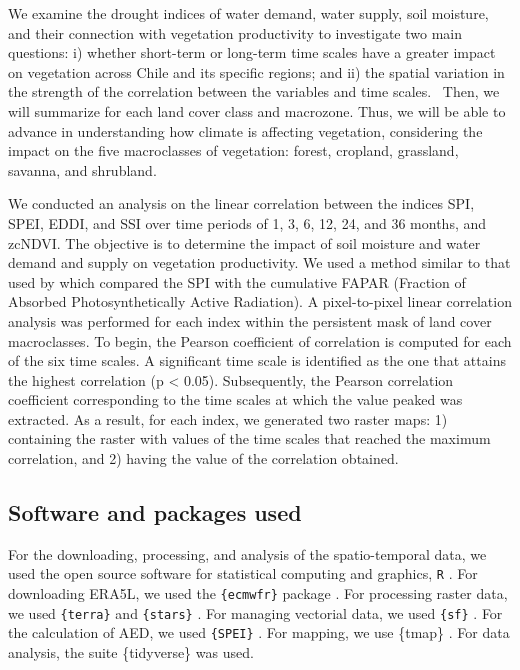 \documentclass[
  authoryear,
  preprint,
  3p,
  onecolumn]{elsarticle}
\begin{document}
We examine the drought indices of water demand, water supply, soil
moisture, and their connection with vegetation productivity to
investigate two main questions: i) whether short-term or long-term time
scales have a greater impact on vegetation across Chile and its specific
regions; and ii) the spatial variation in the strength of the
correlation between the variables and time scales.~ Then, we will
summarize for each land cover class and macrozone. Thus, we will be able
to advance in understanding how climate is affecting vegetation,
considering the impact on the five macroclasses of vegetation: forest,
cropland, grassland, savanna, and shrubland.

We conducted an analysis on the linear correlation between the indices
SPI, SPEI, EDDI, and SSI over time periods of 1, 3, 6, 12, 24, and 36
months, and zcNDVI. The objective is to determine the impact of soil
moisture and water demand and supply on vegetation productivity. We used
a method similar to that used by \citet{Meroni2017} which compared the
SPI with the cumulative FAPAR (Fraction of Absorbed Photosynthetically
Active Radiation). A pixel-to-pixel linear correlation analysis was
performed for each index within the persistent mask of land cover
macroclasses. To begin, the Pearson coefficient of correlation is
computed for each of the six time scales. A significant time scale is
identified as the one that attains the highest correlation (p
\textless{} 0.05). Subsequently, the Pearson correlation coefficient
corresponding to the time scales at which the value peaked was
extracted. As a result, for each index, we generated two raster maps: 1)
containing the raster with values of the time scales that reached the
maximum correlation, and 2) having the value of the correlation
obtained.

\hypertarget{software-and-packages-used}{%
\subsection{Software and packages
used}\label{software-and-packages-used}}

For the downloading, processing, and analysis of the spatio-temporal
data, we used the open source software for statistical computing and
graphics, \texttt{R} \citep{R2023}. For downloading ERA5L, we used the
\texttt{\{ecmwfr\}} package \citep{Hufkens2019}. For processing raster
data, we used \texttt{\{terra\}} \citep{Hijmans2023} and
\texttt{\{stars\}} \citep{Pebesma2023}. For managing vectorial data, we
used \texttt{\{sf\}} \citep{Pebesma2018}. For the calculation of AED, we
used \texttt{\{SPEI\}} \citep{Bergueria2023}. For mapping, we use
\{tmap\} \citep{Tennekes2018}. For data analysis, the suite
\{tidyverse\} \citep{Wickham2019} was used.
\end{document}
